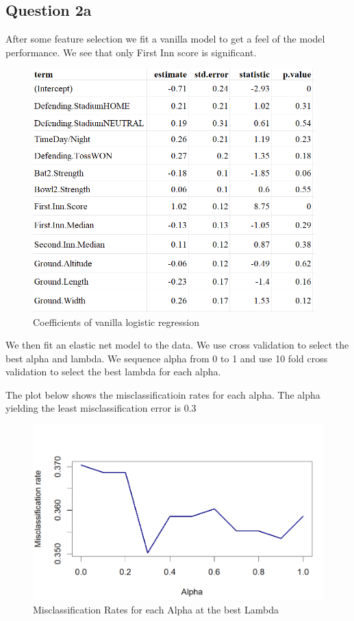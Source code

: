 \documentclass[
]{article}
\begin{document}
\hypertarget{question-2a}{%
\subsection{Question 2a}\label{question-2a}}

After some feature selection we fit a vanilla model to get a feel of the
model performance. We see that only First Inn score is significant.

\begin{figure}
\centering
\includegraphics[width=4.28125in,height=\textheight]{coef_pval_vanilla_ipl.png}
\caption{Coefficients of vanilla logistic regression}
\end{figure}

We then fit an elastic net model to the data. We use cross validation to
select the best alpha and lambda. We sequence alpha from 0 to 1 and use
10 fold cross validation to select the best lambda for each alpha.

The plot below shows the misclassificatioin rates for each alpha. The
alpha yielding the least misclassification error is 0.3

\begin{figure}
\centering
\includegraphics{misclass_rate_ipl.png}
\caption{Misclassification Rates for each Alpha at the best Lambda}
\end{figure}
\end{document}
